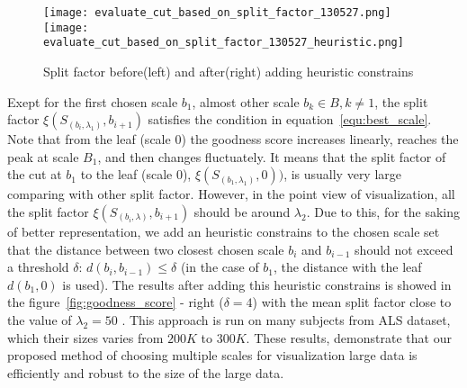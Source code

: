 \begin{figure}
  \centering
  \texttt{[image: evaluate\_cut\_based\_on\_split\_factor\_130527.png]}
  \texttt{[image: evaluate\_cut\_based\_on\_split\_factor\_130527\_heuristic.png]}
  \caption{Split factor before(left) and after(right) adding heuristic constrains}
  \label{fig:split_factor}
\end{figure}

Exept for the first chosen scale $b_1$, almost other scale $b_k \in \mathsf{\textit{B}}, k \neq 1$, the split factor $\xi(S_{(b_i,\lambda_1)},b_{i+1})$ satisfies the condition in equation~\ref{equ:best_scale}. Note that from the leaf (scale $0$) the goodness score increases linearly, reaches the peak at scale $B_1$, and then changes fluctuately. It means that the split factor of the cut at $b_1$ to the leaf (scale $0$), $\xi(S_{(b_1,\lambda_1)},0))$, is usually very large comparing with other split factor. However, in the point view of visualization, all the split factor $\xi(S_{(b_i,\lambda)},b_{i+1})$ should be around $\lambda_2$. Due to this, for the saking of better representation, we add an heuristic constrains to the chosen scale set that the distance between two closest chosen scale $b_i$ and $b_{i-1}$ should not exceed a threshold $\delta$: $d(b_i,b_{i-1}) \leq \delta$ (in the case of $b_1$, the distance with the leaf $d(b_1,0)$ is used). The results after adding this heuristic constrains is showed in the figure~\ref{fig:goodness_score} - right ($\delta = 4$) with the mean split factor close to the value of $\lambda_2 = 50$ . This approach is run on many subjects from ALS dataset, which their sizes varies from $200K$ to $300K$. These results, demonstrate that our proposed method of choosing multiple scales for visualization large data is efficiently and robust to the size of the large data. 


